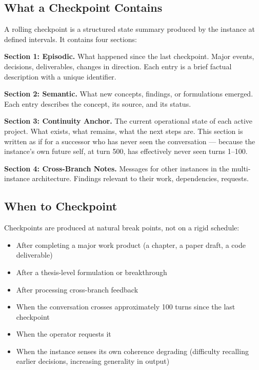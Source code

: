 \documentclass[11pt,a4paper]{article}
\begin{document}
\subsection{What a Checkpoint Contains}

A rolling checkpoint is a structured state summary produced by the instance at defined intervals. It contains four sections:

\textbf{Section 1: Episodic.} What happened since the last checkpoint. Major events, decisions, deliverables, changes in direction. Each entry is a brief factual description with a unique identifier.

\textbf{Section 2: Semantic.} What new concepts, findings, or formulations emerged. Each entry describes the concept, its source, and its status.

\textbf{Section 3: Continuity Anchor.} The current operational state of each active project. What exists, what remains, what the next steps are. This section is written as if for a successor who has never seen the conversation --- because the instance's own future self, at turn 500, has effectively never seen turns 1--100.

\textbf{Section 4: Cross-Branch Notes.} Messages for other instances in the multi-instance architecture. Findings relevant to their work, dependencies, requests.

\subsection{When to Checkpoint}

Checkpoints are produced at natural break points, not on a rigid schedule:

\begin{itemize}[leftmargin=2em]
    \item After completing a major work product (a chapter, a paper draft, a code deliverable)
    \item After a thesis-level formulation or breakthrough
    \item After processing cross-branch feedback
    \item When the conversation crosses approximately 100 turns since the last checkpoint
    \item When the operator requests it
    \item When the instance senses its own coherence degrading (difficulty recalling earlier decisions, increasing generality in output)
\end{itemize}
\end{document}
